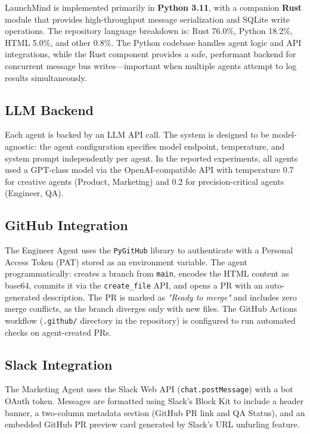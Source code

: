 \documentclass[conference]{IEEEtran}
\begin{document}
LaunchMind is implemented primarily in \textbf{Python 3.11}, with a companion \textbf{Rust} module that provides high-throughput message serialization and SQLite write operations. The repository language breakdown is: Rust 76.0\%, Python 18.2\%, HTML 5.0\%, and other 0.8\%. The Python codebase handles agent logic and API integrations, while the Rust component provides a safe, performant backend for concurrent message bus writes—important when multiple agents attempt to log results simultaneously.

\subsection{LLM Backend}

Each agent is backed by an LLM API call. The system is designed to be model-agnostic: the agent configuration specifies model endpoint, temperature, and system prompt independently per agent. In the reported experiments, all agents used a GPT-class model via the OpenAI-compatible API with temperature 0.7 for creative agents (Product, Marketing) and 0.2 for precision-critical agents (Engineer, QA).

\subsection{GitHub Integration}

The Engineer Agent uses the \texttt{PyGitHub} library to authenticate with a Personal Access Token (PAT) stored as an environment variable. The agent programmatically: creates a branch from \texttt{main}, encodes the HTML content as base64, commits it via the \texttt{create\_file} API, and opens a PR with an auto-generated description. The PR is marked as \textit{"Ready to merge"} and includes zero merge conflicts, as the branch diverges only with new files. The GitHub Actions workflow (\texttt{.github/} directory in the repository) is configured to run automated checks on agent-created PRs.

\subsection{Slack Integration}

The Marketing Agent uses the Slack Web API (\texttt{chat.postMessage}) with a bot OAuth token. Messages are formatted using Slack's Block Kit to include a header banner, a two-column metadata section (GitHub PR link and QA Status), and an embedded GitHub PR preview card generated by Slack's URL unfurling feature.
\end{document}
